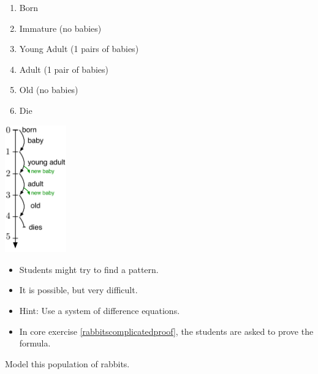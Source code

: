 \begin{minipage}{.6\textwidth}
\begin{enumerate}[start=0,label=(year \arabic*)]
		\item Born
		\item Immature (no babies)
		\item Young Adult (1 pairs of babies)
		\item Adult (1 pair of babies)
		\item Old (no babies)
		\item Die
	\end{enumerate}	
\end{minipage}
\hfil
\begin{minipage}{75pt}
	\includegraphics*[width=75pt]{images/module24-complicated-life.pdf}
\end{minipage}
\begin{annotation}
	\begin{goals}
		\begin{itemize}
			\item Students might try to find a pattern. 
			\item It is possible, but very difficult.
			\item Hint: Use a system of difference equations. 
			\item In core exercise \ref{rabbitscomplicatedproof}, the students are asked to prove the formula.
		\end{itemize}
	\end{goals}
\end{annotation}
	
	Model this population of rabbits.
	
	




\standardonlynewpage



%
%



